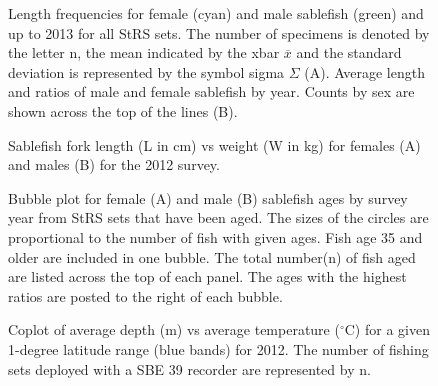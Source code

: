 \documentclass[12pt]{article}\usepackage[]{graphicx}\usepackage[]{color}
\begin{document}
\begin{figure}[htb]

{\centering {} 

}

\caption{Length frequencies for female (cyan) and male sablefish (green) and up to 2013 for all StRS sets. The number of specimens is denoted by the letter n, the mean indicated by the xbar \(\overline{x}\) and the standard deviation is represented by the symbol sigma \(\Sigma\) (A). Average length and ratios of male and female sablefish by year. Counts by sex are shown across the top of the lines (B).}\label{fig:figure10}
\end{figure}
\clearpage


\begin{figure}[htb]

{\centering {} 

}

\caption{Sablefish fork length (L in cm) vs weight (W in kg) for females (A) and males (B) for the 2012 survey.}\label{fig:figure11}
\end{figure}

\begin{figure}[htb]

{\centering {} 

}

\caption{Bubble plot for female (A) and male (B) sablefish ages by survey year from StRS sets that have been aged. The sizes of the circles are proportional to the number of fish with given ages. Fish age 35 and older are included in one bubble. The total number(n) of fish aged are listed across the top of each panel. The ages with the highest ratios are posted to the right of each bubble.}\label{fig:figure12}
\end{figure}
\clearpage


\begin{figure}[htb]

{\centering {} 

}

\caption{Coplot of average depth (m) vs average temperature (\(^\circ\)C) for a given 1-degree latitude range (blue bands) for 2012. The number of fishing sets deployed with a SBE 39 recorder are represented by n.}\label{fig:figure13}
\end{figure}
\clearpage
\end{document}
